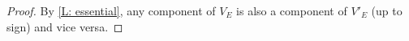 \begin{proof}
	By \cref{L: essential}, any component of $V_E$ is also a component of $V'_E$ (up to sign) and vice versa.
\end{proof}

